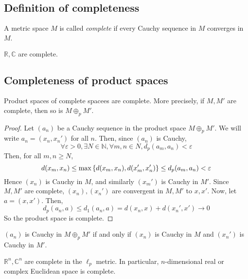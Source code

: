 \subsection{Definition of completeness}
\begin{definition}
	A metric space \( M \) is called \textit{complete} if every Cauchy sequence in \( M \) converges in \( M \).
\end{definition}
\begin{example}
	\( \mathbb R, \mathbb C \) are complete.
\end{example}

\subsection{Completeness of product spaces}
\begin{proposition}
	Product spaces of complete spacees are complete.
	More precisely, if \( M, M' \) are complete, then so is \( M \oplus_p M' \).
\end{proposition}
\begin{proof}
	Let \( (a_n) \) be a Cauchy sequence in the product space \( M \oplus_p M' \).
	We will write \( a_n = (x_n, x_n') \) for all \( n \).
	Then, since \( (a_n) \) is Cauchy,
	\[
		\forall \varepsilon > 0, \exists N \in \mathbb N, \forall m,n \in N, d_p(a_m, a_n) < \varepsilon
	\]
	Then, for all \( m, n \geq N \),
	\[
		d(x_m,x_n) \leq \max\qty{d(x_m,x_n), d(x_m', x_n')} \leq d_p(a_m,a_n) < \varepsilon
	\]
	Hence \( (x_n) \) is Cauchy in \( M \), and similarly \( (x_m') \) is Cauchy in \( M' \).
	Since \( M, M' \) are complete, \( (x_n), (x_n') \) are convergent in \( M, M' \) to \( x, x' \).
	Now, let \( a = (x,x') \).
	Then,
	\[
		d_p(a_n,a) \leq d_1(a_n,a) = d(x_n,x) + d(x_n',x') \to 0
	\]
	So the product space is complete.
\end{proof}
\begin{remark}
	\( (a_n) \) is Cauchy in \( M \oplus_p M' \) if and only if \( (x_n) \) is Cauchy in \( M \) and \( (x_n') \) is Cauchy in \( M' \).
\end{remark}
\begin{corollary}
	\( \mathbb R^n, \mathbb C^n \) are complete in the \( \ell_p \) metric.
	In particular, \( n \)-dimensional real or complex Euclidean space is complete.
\end{corollary}

